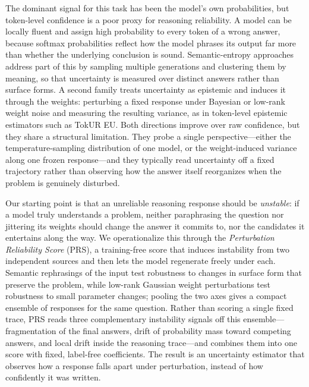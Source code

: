\documentclass{article} %
\begin{document}
The dominant signal for this task has been the model's own probabilities, but
token-level confidence is a poor proxy for reasoning reliability. A model can be
locally fluent and assign high probability to every token of a wrong answer,
because softmax probabilities reflect how the model phrases its output far more
than whether the underlying conclusion is sound. Semantic-entropy approaches
address part of this by sampling multiple generations and clustering them by
meaning, so that uncertainty is measured over distinct answers rather than
surface forms. A second family treats uncertainty as epistemic and induces it
through the weights: perturbing a fixed response under Bayesian or low-rank
weight noise and measuring the resulting variance, as in token-level epistemic
estimators such as TokUR EU. Both directions improve over raw confidence, but
they share a structural limitation. They probe a single perspective---either the
temperature-sampling distribution of one model, or the weight-induced variance
along one frozen response---and they typically read uncertainty off a fixed
trajectory rather than observing how the answer itself reorganizes when the
problem is genuinely disturbed.

Our starting point is that an unreliable reasoning response should be
\emph{unstable}: if a model truly understands a problem, neither paraphrasing the
question nor jittering its weights should change the answer it commits to, nor
the candidates it entertains along the way. We operationalize this through the
\emph{Perturbation Reliability Score} (PRS), a training-free score that induces
instability from two independent sources and then lets the model regenerate
freely under each. Semantic rephrasings of the input test robustness to changes
in surface form that preserve the problem, while low-rank Gaussian weight
perturbations test robustness to small parameter changes; pooling the two axes
gives a compact ensemble of responses for the same question. Rather than scoring
a single fixed trace, PRS reads three complementary instability signals off this
ensemble---fragmentation of the final answers, drift of probability mass toward
competing answers, and local drift inside the reasoning trace---and combines
them into one score with fixed, label-free coefficients. The result is an
uncertainty estimator that observes how a response falls apart under
perturbation, instead of how confidently it was written.
\end{document}
